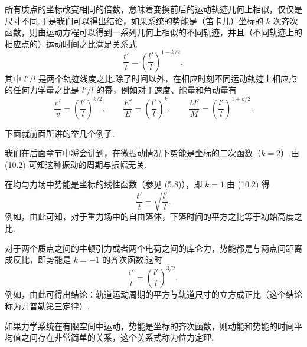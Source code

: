 所有质点的坐标改变相同的倍数，意味着变换前后的运动轨迹几何上相似，仅仅是尺寸不同.于是我们可以得出结论，如果系统的势能是（笛卡儿）坐标的 $k$ 次齐次函数，则由运动方程可以得到一系列几何上相似的不同轨迹，并且（不同轨迹上的相应点的）运动时间之比满足关系式
\begin{equation}
  \frac{t'}{t}=\left(\frac{l'}{l}\right)^{1-k/2},
\end{equation}
其中 $l'/l$ 是两个轨迹线度之比.除了时间以外，在相应时刻不同运动轨迹上相应点的任何力学量之比是 $l'/l$ 的幂，例如对于速度、能量和角动量有
\begin{equation}
  \frac{v'}{v}=\left(\frac{l'}{l}\right)^{k/2},\qquad
  \frac{E'}{E}=\left(\frac{l'}{l}\right)^{k},\qquad
  \frac{M'}{M}=\left(\frac{l'}{l}\right)^{1+k/2}.
\end{equation}

下面就前面所讲的举几个例子.

我们在后面章节中将会讲到，在微振动情况下势能是坐标的二次函数（$k=2$）.由 (10.2) 可知这种振动的周期与振幅无关.

在均匀力场中势能是坐标的线性函数（参见 (5.8)），即 $k=1$.由 (10.2) 得
\begin{equation*}
  \frac{t'}{t}=\sqrt{\frac{l'}{l}}.
\end{equation*}
例如，由此可知，对于重力场中的自由落体，下落时间的平方之比等于初始高度之比.

对于两个质点之间的牛顿引力或者两个电荷之间的库仑力，势能都是与两点间距离成反比，即势能是 $k=-1$ 的齐次函数.这时
\begin{equation*}
  \frac{t'}{t}=\left(\frac{l'}{l}\right)^{3/2},
\end{equation*}
例如，由此可得出结论：轨道运动周期的平方与轨道尺寸的立方成正比（这个结论称为开普勒第三定律）.

如果力学系统在有限空间中运动，势能是坐标的齐次函数，则动能和势能的时间平均值之间存在非常简单的关系，这个关系式称为位力定理.

